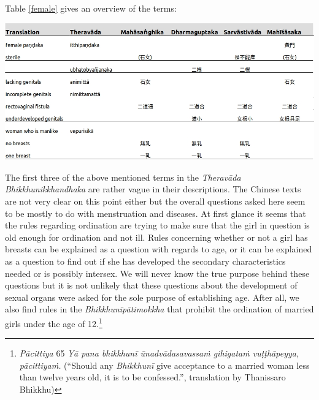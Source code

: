 Table \ref{female} gives an overview of the terms:

\bigskip
\includegraphics[width=\textwidth]{female.jpg}
\begin{minipage}{\textwidth}
\label{female}
\end{minipage}
\medskip

The first three of the above mentioned terms in the {\em Theravāda} {\em Bhikkhunikkhandhaka} are rather vague in their descriptions. The Chinese texts are not very clear on this point either but the overall questions asked here seem to be mostly to do with menstruation and diseases. At first glance it seems that the rules regarding ordination are trying to make sure that the girl in question is old enough for ordination and not ill. Rules concerning whether or not a girl has breasts can be explained as a question with regards to age, or it can be explained as a question to find out if she has developed the secondary characteristics needed or is possibly intersex. We will never know the true purpose behind these questions but it is not unlikely that these questions about the development of sexual organs were asked for the sole purpose of establishing age. After all, we also find rules in the {\em Bhikkhunīpātimokkha} that prohibit the ordination of married girls under the age of 12.\footnote{{\em Pācittiya} 65 {\em Yā pana bhikkhunī ūnad­vāda­sa­vassaṁ gihigataṁ vuṭṭhāpeyya, pācittiyaṁ.} (``Should any {\em Bhikkhunī} give acceptance to a married woman less than twelve years old, it is to be confessed.'', translation by Thanissaro Bhikkhu)} 

